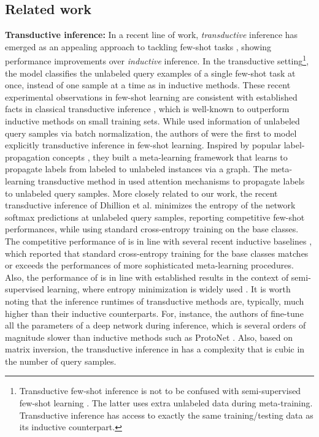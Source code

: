 \documentclass{article}
\begin{document}
    \subsection{Related work}
        \textbf{Transductive inference:} In a recent line of work, {\em transductive} inference has emerged as an appealing approach to tackling few-shot tasks \cite{dhillon2019baseline, can, kim2019edge,liu2018learning,team, nichol2018firstorder, prototype, Laplacian}, showing performance improvements over {\em inductive} inference. In the transductive setting\footnote{Transductive few-shot inference is not to be confused with semi-supervised few-shot learning \cite{tiered_imagenet, paper_to_please_R1}. The latter uses extra unlabeled data during meta-training. Transductive inference has access to exactly the same training/testing data as its inductive counterpart.}, the model classifies the unlabeled query examples of a single few-shot task at once, instead of one sample at a time as in inductive methods.
These recent experimental observations in few-shot learning are consistent with established facts in classical transductive inference \cite{vapnik1999overview,joachim99,z2004learning}, which is well-known to outperform inductive methods on small training sets. While \cite{nichol2018firstorder} used information of unlabeled query samples via batch normalization, the authors of \cite{liu2018learning} were the first to model explicitly transductive inference in few-shot learning. Inspired by popular label-propagation concepts \cite{z2004learning}, they built a meta-learning framework that learns to propagate labels from labeled to unlabeled instances via a graph. The meta-learning transductive method in \cite{can} used attention mechanisms to propagate labels to unlabeled query samples. More closely related to our work, the recent transductive inference of Dhillion et al. \cite{dhillon2019baseline} minimizes the entropy of the network softmax predictions at unlabeled query samples, reporting competitive few-shot performances, while using standard cross-entropy training on the base classes. The competitive performance of \cite{dhillon2019baseline} is in line with several recent inductive baselines \cite{closer_look,simpleshot,tian2020rethinking}, which reported that standard cross-entropy training for the base classes matches or exceeds the performances of more sophisticated meta-learning procedures. Also, the performance of \cite{dhillon2019baseline} is in line with established results in the context of semi-supervised learning, where entropy minimization is widely used \cite{grandvalet2005semi,miyato2018virtual,berthelot2019mixmatch}. It is worth noting that the inference runtimes of transductive methods are, typically, much higher than their inductive counterparts. For, instance, the authors of \cite{dhillon2019baseline} fine-tune all the parameters of a deep network during inference, which is several orders of magnitude slower than inductive methods such as ProtoNet \cite{prototypical_nets}. Also, based on matrix inversion, the transductive inference in \cite{liu2018learning} has a complexity that is cubic in the number of query samples.
            
\end{document}
